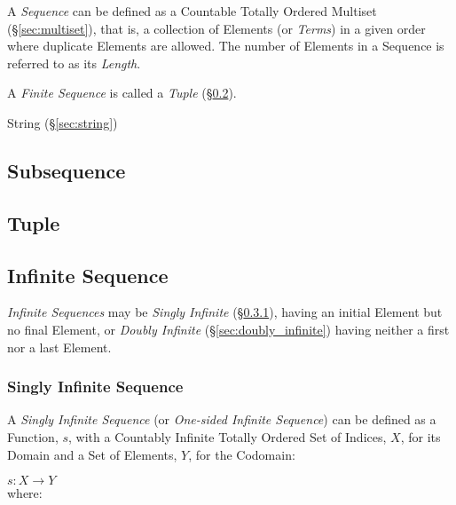 A \emph{Sequence} can be defined as a Countable Totally Ordered
Multiset (\S\ref{sec:multiset}), that is, a collection of Elements (or
\emph{Terms}) in a given order where duplicate Elements are allowed.
The number of Elements in a Sequence is referred to as its
\emph{Length}.

A \emph{Finite Sequence} is called a \emph{Tuple} (\S\ref{sec:tuple}).

String (\S\ref{sec:string})



\subsection{Subsequence}\label{sec:subsequence}

\subsection{Tuple}\label{sec:tuple}

\subsection{Infinite Sequence}\label{sec:infinite_sequence}

\emph{Infinite Sequences} may be \emph{Singly Infinite}
(\S\ref{sec:singly_infinite}), having an initial Element but no final
Element, or \emph{Doubly Infinite} (\S\ref{sec:doubly_infinite})
having neither a first nor a last Element.



\subsubsection{Singly Infinite Sequence}\label{sec:singly_infinite}

A \emph{Singly Infinite Sequence} (or \emph{One-sided Infinite
  Sequence}) can be defined as a Function, $s$, with a Countably
Infinite Totally Ordered Set of Indices, $X$, for its Domain and a Set
of Elements, $Y$, for the Codomain:

  $s : X \rightarrow Y$ \\
where:

